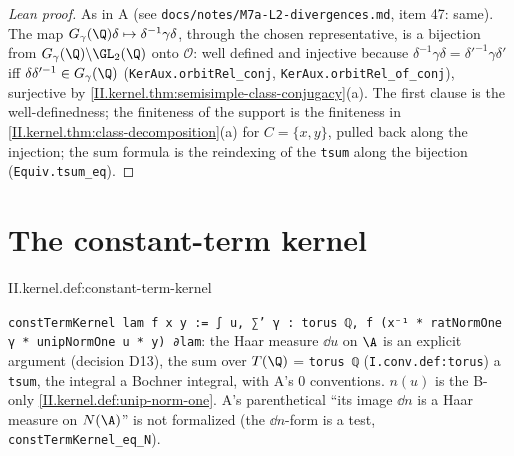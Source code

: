 \begin{proof}[Lean proof]
As in A (see \texttt{docs/notes/M7a-L2-divergences.md}, item 47: same). The map $G_\gamma(\Q)\delta\mapsto\delta^{-1}\gamma\delta$, through the chosen representative, is a bijection from $G_\gamma(\Q)\backslash\GL_2(\Q)$ onto $\mathcal O$: well defined and injective because $\delta^{-1}\gamma\delta=\delta'^{-1}\gamma\delta'$ iff $\delta\delta'^{-1}\in G_\gamma(\Q)$ (\texttt{KerAux.orbitRel\_conj}, \texttt{KerAux.orbitRel\_of\_conj}), surjective by \cref{II.kernel.thm:semisimple-class-conjugacy}(a). The first clause is the well-definedness; the finiteness of the support is the finiteness in \cref{II.kernel.thm:class-decomposition}(a) for $C=\{x,y\}$, pulled back along the injection; the sum formula is the reindexing of the \texttt{tsum} along the bijection (\texttt{Equiv.tsum\_eq}).
\end{proof}

\section{The constant-term kernel}\label{sec:kernel-constant-term}

\begin{definition}
\end{definition}
\begin{tfformal}{II.kernel.def:constant-term-kernel}
\begin{tffidelity}
\texttt{constTermKernel lam f x y := ∫ u, ∑' γ : torus ℚ, f (x⁻¹ * ratNormOne γ * unipNormOne u * y) ∂lam}: the Haar measure $\dd u$ on $\A$ is an explicit argument (decision D13), the sum over $T(\Q)$ = \texttt{torus ℚ} (\texttt{I.conv.def:torus}) a \texttt{tsum}, the integral a Bochner integral, with A's $0$ conventions. $n(u)$ is the B-only \cref{II.kernel.def:unip-norm-one}. A's parenthetical ``its image $\dd n$ is a Haar measure on $N(\A)$'' is not formalized (the $\dd n$-form is a test, \texttt{constTermKernel\_eq\_N}).
\end{tffidelity}
\end{tfformal}

